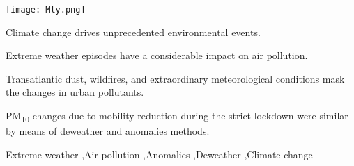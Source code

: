 \documentclass[preprint,12pt]{elsarticle}
\begin{document}
\begin{frontmatter}
\begin{abstract}
	\end{abstract}
	\begin{graphicalabstract}
		\texttt{[image: Mty.png]}
	\end{graphicalabstract}
	\begin{highlights}
		\item Climate change drives unprecedented environmental events.
		\item Extreme weather episodes have a considerable impact on air pollution.
		\item Transatlantic dust, wildfires, and extraordinary meteorological conditions mask the changes in urban pollutants.
		\item PM\textsubscript{10} changes due to mobility reduction during the strict lockdown were similar by means of deweather and anomalies methods.
	\end{highlights}
	\begin{keyword}
		Extreme weather \sep Air pollution \sep Anomalies \sep Deweather \sep Climate change
	\end{keyword}
\end{frontmatter}
\end{document}

